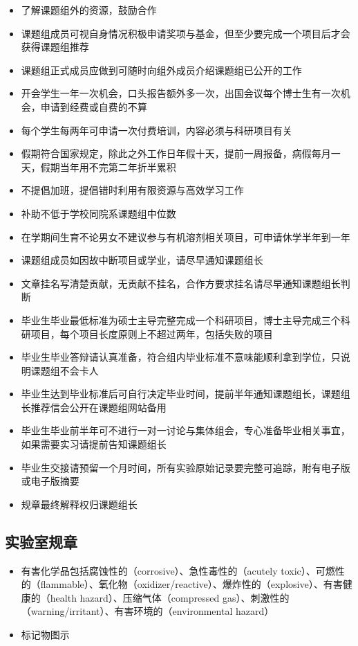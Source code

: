 \documentclass[]{tufte-book}
\providecommand{\tightlist}{%
  \setlength{\itemsep}{0pt}\setlength{\parskip}{0pt}}
\begin{document}
\begin{itemize}
\item
  了解课题组外的资源，鼓励合作
\item
  课题组成员可视自身情况积极申请奖项与基金，但至少要完成一个项目后才会获得课题组推荐
\item
  课题组正式成员应做到可随时向组外成员介绍课题组已公开的工作
\item
  开会学生一年一次机会，口头报告额外多一次，出国会议每个博士生有一次机会，申请到经费或自费的不算
\item
  每个学生每两年可申请一次付费培训，内容必须与科研项目有关
\item
  假期符合国家规定，除此之外工作日年假十天，提前一周报备，病假每月一天，假期当年用不完第二年折半累积
\item
  不提倡加班，提倡错时利用有限资源与高效学习工作
\item
  补助不低于学校同院系课题组中位数
\item
  在学期间生育不论男女不建议参与有机溶剂相关项目，可申请休学半年到一年
\item
  课题组成员如因故中断项目或学业，请尽早通知课题组长
\item
  文章挂名写清楚贡献，无贡献不挂名，合作方要求挂名请尽早通知课题组长判断
\item
  毕业生毕业最低标准为硕士主导完整完成一个科研项目，博士主导完成三个科研项目，每个项目长度原则上不超过两年，包括失败的项目
\item
  毕业生毕业答辩请认真准备，符合组内毕业标准不意味能顺利拿到学位，只说明课题组不会卡人
\item
  毕业生达到毕业标准后可自行决定毕业时间，提前半年通知课题组长，课题组长推荐信会公开在课题组网站备用
\item
  毕业生毕业前半年可不进行一对一讨论与集体组会，专心准备毕业相关事宜，如果需要实习请提前告知课题组长
\item
  毕业生交接请预留一个月时间，所有实验原始记录要完整可追踪，附有电子版或电子版摘要
\item
  规章最终解释权归课题组长
\end{itemize}

\hypertarget{ux5b9eux9a8cux5ba4ux89c4ux7ae0}{%
\subsection{实验室规章}\label{ux5b9eux9a8cux5ba4ux89c4ux7ae0}}

\begin{itemize}
\tightlist
\item
  有害化学品包括腐蚀性的（corrosive）、急性毒性的（acutely toxic）、可燃性的（flammable）、氧化物（oxidizer/reactive）、爆炸性的（explosive）、有害健康的（health hazard）、压缩气体（compressed gas）、刺激性的（warning/irritant）、有害环境的（environmental hazard）
\item
  标记物图示
\end{itemize}
\end{document}
